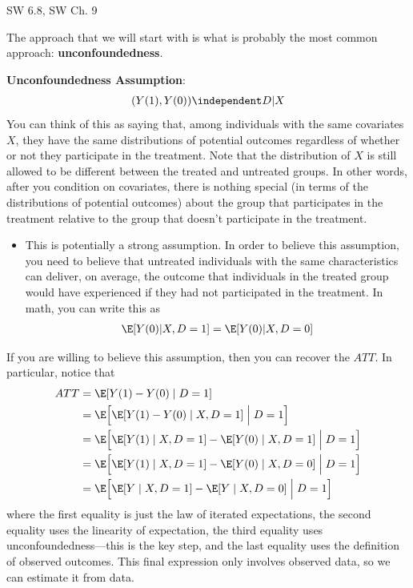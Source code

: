 \documentclass[
  letterpaper,
  DIV=11,
  numbers=noendperiod]{scrreprt}
\providecommand{\tightlist}{%
  \setlength{\itemsep}{0pt}\setlength{\parskip}{0pt}}\usepackage{longtable,booktabs,array}
\begin{document}
SW 6.8, SW Ch. 9

The approach that we will start with is what is probably the most common
approach: \textbf{unconfoundedness}.

\textbf{Unconfoundedness Assumption}: \begin{align*}
  (Y(1),Y(0)) \independent D | X
\end{align*} You can think of this as saying that, among individuals
with the same covariates \(X\), they have the same distributions of
potential outcomes regardless of whether or not they participate in the
treatment. Note that the distribution of \(X\) is still allowed to be
different between the treated and untreated groups. In other words,
after you condition on covariates, there is nothing special (in terms of
the distributions of potential outcomes) about the group that
participates in the treatment relative to the group that doesn't
participate in the treatment.

\begin{itemize}
\tightlist
\item
  This is potentially a strong assumption. In order to believe this
  assumption, you need to believe that untreated individuals with the
  same characteristics can deliver, on average, the outcome that
  individuals in the treated group would have experienced if they had
  not participated in the treatment. In math, you can write this as
  \begin{align*}
      \E[Y(0) | X, D=1] = \E[Y(0) | X, D=0]
    \end{align*}
\end{itemize}

If you are willing to believe this assumption, then you can recover the
\(ATT\). In particular, notice that \begin{align*}
  ATT &= \E[Y(1) - Y(0) \mid D=1] \\
  &= \E\Big[\E[Y(1) - Y(0) \mid X, D=1] \Bigm| D=1\Big] \\
  &= \E\Big[\E[Y(1) \mid X, D=1] - \E[Y(0) \mid X, D=1] \Bigm| D=1\Big] \\
  &= \E\Big[\E[Y(1) \mid X, D=1] - \E[Y(0) \mid X, D=0] \Bigm| D=1\Big] \\
  &= \E\Big[\E[Y \mid X, D=1] - \E[Y \mid X, D=0] \Bigm| D=1\Big]
\end{align*} where the first equality is just the law of iterated
expectations, the second equality uses the linearity of expectation, the
third equality uses unconfoundedness---this is the key step, and the
last equality uses the definition of observed outcomes. This final
expression only involves observed data, so we can estimate it from data.
\end{document}
